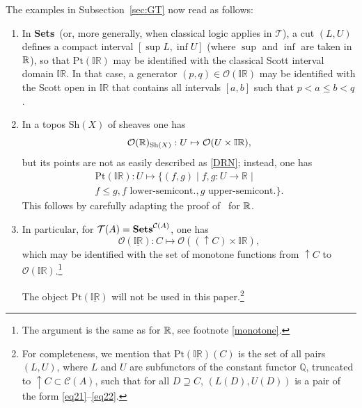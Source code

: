 \documentclass[12pt]{article}
\newcommand{\IR}{\mathbb{IR}}
\newcommand{\beq}{\begin{equation}}
\newcommand{\eeq}{\end{equation}}
\newcommand{\Sets}{\mbox{\textbf{Sets}}}
\newcommand{\x}{\times} \newcommand{\hb}{\hbar}
\newcommand{\er}{\eqref}
\newcommand{\CA}{{\mathcal A}} \newcommand{\CB}{{\mathcal B}}
\newcommand{\CO}{{\mathcal O}} \newcommand{\CP}{{\mathcal P}}
\newcommand{\CT}{{\mathcal T}} \newcommand{\CV}{{\mathcal V}}
\newcommand{\alg}[1]{\ensuremath{#1}}
\newcommand{\Sh}{\ensuremath{\mathrm{Sh}}}
\newcommand{\context}{\ensuremath{\mathcal{C}}}
\newcommand{\asstopos}{\ensuremath{\mathcal{T}}}
\newcommand{\field}[1]{\ensuremath{\mathbb{#1}}}
\renewcommand{\CA}{\mathcal{C}(A)}
\newcommand{\TA}{\mathcal{T}(A)}
\renewcommand{\TA}{\asstopos(\alg{A})}
\renewcommand{\CA}{\context(\alg{A})}
\begin{document}
The examples in Subsection~\ref{sec:GT} now read
as follows:
\begin{enumerate}
  \item  In \Sets\ (or, more generally, when classical logic applies in
    $\CT$), a cut $(L,U)$ defines a compact interval $[\sup L,\inf U]$
    (where $\sup$ and $\inf$ are taken in ${\mathbb R}$), so that
    $\mathrm{Pt}(\IR)$ may be identified with the classical Scott interval domain
    $\IR$. In that case, a generator $(p,q)\in\CO(\IR)$ may be
    identified with the Scott open in $\IR$ that contains all
    intervals $[a,b]$ such that $p<a\leqslant b<q$.

  \item In a topos $\Sh(X)$ of sheaves one has 
  \beq \CO(\R)_{\Sh(X)}: U\mapsto \CO(U\x \IR),\eeq
  but  its points are not as easily described as \er{DRN}; instead, one has
  \begin{multline}
  \mathrm{Pt}(\IR): U\mapsto
     \{(f,g) \mid f,g:U \to \field{R} \mid \\ f \leqslant g,
         f \mbox{ lower-semicont.},  
        g \mbox{ upper-semicont.}\}
  .\end{multline}
    This follows by carefully adapting the proof
    of~\cite[Theorem~VI.8.2]{maclanemoerdijk92} for ${\mathbb R}$. 
  \item
    In particular, for  $\TA=\Sets^{\CA}$, one has 
       \beq
    \CO(\underline{\IR}):
    C\mapsto \CO((\uparrow\! C)\x \IR), \label{ddrr}\eeq
   which may be identified with the set of monotone functions from $\uparrow\! C$ to $\CO(\IR)$.\footnote{The argument is the same as for ${\mathbb R}$, see footnote \ref{monotone}.}
     
   The object  $\mathrm{Pt}(\underline{\IR})$ will not be used in this paper.\footnote{For completeness, we mention that $\mathrm{Pt}(\underline{\IR})(C)$ is the set of all pairs $(L,U)$, where $L$ and $U$ are subfunctors of the constant functor $\mathbb{Q}$, truncated to $\uparrow\! C\subset\CA$, such that for all $D\supseteq C$, $(L(D),U(D))$ is a pair 
   of the form \er{eq21}--\er{eq22}.}
 \end{enumerate}
\end{document}
